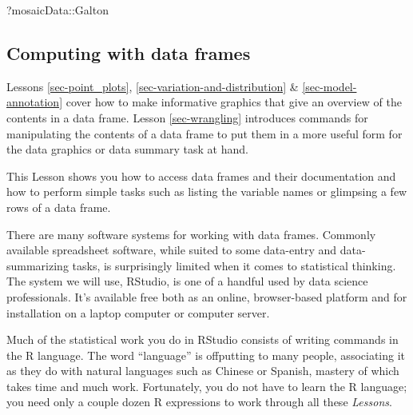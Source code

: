 \documentclass[
  letterpaper,
  DIV=11,
  numbers=noendperiod,
  oneside]{scrartcl}
\newenvironment{Shaded}{\begin{snugshade}}{\end{snugshade}}
\newcommand{\NormalTok}[1]{\textcolor[rgb]{0.00,0.23,0.31}{#1}}
\newcommand{\SpecialCharTok}[1]{\textcolor[rgb]{0.37,0.37,0.37}{#1}}
\begin{document}
\begin{Shaded}
\begin{Highlighting}[]
\NormalTok{?mosaicData}\SpecialCharTok{::}\NormalTok{Galton}
\end{Highlighting}
\end{Shaded}

\subsection{Computing with data frames}\label{sec-computing-data-frames}

Lessons \ref{sec-point_plots}, \ref{sec-variation-and-distribution} \&
\ref{sec-model-annotation} cover how to make informative graphics that
give an overview of the contents in a data frame. Lesson
\ref{sec-wrangling} introduces commands for manipulating the contents of
a data frame to put them in a more useful form for the data graphics or
data summary task at hand.

This Lesson shows you how to access data frames and their documentation
and how to perform simple tasks such as listing the variable names or
glimpsing a few rows of a data frame.

There are many software systems for working with data frames. Commonly
available spreadsheet software, while suited to some data-entry and
data-summarizing tasks, is surprisingly limited when it comes to
statistical thinking. The system we will use, RStudio, is one of a
handful used by data science professionals. It's available free both as
an online, browser-based platform and for installation on a laptop
computer or computer server.

Much of the statistical work you do in RStudio consists of writing
commands in the R language. The word ``language'' is offputting to many
people, associating it as they do with natural languages such as Chinese
or Spanish, mastery of which takes time and much work. Fortunately, you
do not have to learn the R language; you need only a couple dozen R
expressions to work through all these \emph{Lessons}.

\end{document}
